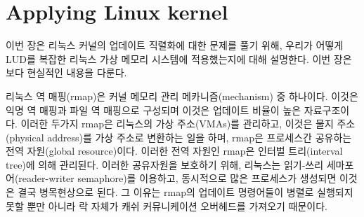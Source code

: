 \newpage
\section{Applying Linux kernel}
\label{sec:linux}



이번 장은 리눅스 커널의 업데이트 직렬화에 대한 문제를 풀기 위해,
우리가 어떻게 LUD를 복잡한 리눅스 가상 메모리 시스템에 적용했는지에 대해 설명한다.
이번 장은 보다 현실적인 내용을 다룬다.

리눅스 역 매핑(rmap)은 커널 메모리 관리 메카니즘(mechanism) 중 하나이다.
이것은 익명 역 매핑과 파일 역 매핑으로 구성되며 이것은 업데이트 비율이 높은 자료구조이다.
이러한 두가지 rmap은 리눅스의 가상 주소(VMAs)를 관리하고, 이것은 물지 주소(physical address)를 
가상 주소로 변환하는 일을 하며, rmap은 프로세스간 공유하는 전역 자원(global resource)이다.
이러한 전역 자원인 rmap은 인터벌 트리(interval tree)에 의해 관리된다.
이러한 공유자원을 보호하기 위해, 리눅스는 읽기-쓰리 세마포어(reader-writer semaphore)를 이용하고, 
동시적으로 많은 프로세스가 생성되면 이것은 결국 병목현상으로 된다. 
그 이유는 rmap의 업데이트 명령어들이 병렬로 실행되지 못할 뿐만 아니라 락 자체가 캐쉬 
커뮤니케이션 오버헤드를 가져오기 때문이다.

